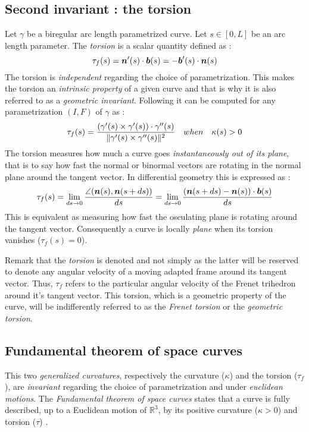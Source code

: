 \subsection{Second invariant : the torsion}\label{sec:torsion}
Let $\gamma$ be a biregular arc length parametrized curve. Let $s \in [0,L]$ be an arc length parameter. The \emph{torsion} is a scalar quantity defined as :
\begin{equation}
	\tau_f(s) = \boldsymbol{n}'(s) \cdot \boldsymbol{b}(s) = - \boldsymbol{b}'(s) \cdot \boldsymbol{n}(s)
\end{equation}
The torsion is \emph{independent} regarding the choice of parametrization. This makes the torsion an \emph{intrinsic property} of a given curve and that is why it is also referred to as a \emph{geometric invariant}. Following \cite[p.204]{Gray2006} it can be computed for any parametrization $(I,F)$ of $\gamma$ as :
\begin{equation}
	\tau_f(s) = \frac{(\gamma'(s) \times \gamma'(s)) \cdot \gamma''(s)}{\lVert\gamma'(s) \times \gamma''(s)\rVert^2}
	\quad when \quad
	\kappa(s) > 0
\end{equation}
The torsion measures how much a curve goes \emph{instantaneously out of its plane}, that is to say how fast the normal or binormal vectors are rotating in the normal plane around the tangent vector. In differential geometry this is expressed as :
\begin{equation}
	\tau_f(s) 
	= \lim_{ds \to 0}\frac{\angle(\boldsymbol{n}(s),\boldsymbol{n}(s+ds))}{ds}
	= \lim_{ds \to 0}\frac{(\boldsymbol{n}(s+ds) - \boldsymbol{n}(s)) \cdot \boldsymbol{b}(s)}{ds}
\end{equation}
This is equivalent as measuring how fast the osculating plane is rotating around the tangent vector. Consequently a curve is locally \emph{plane} when its torsion vanishes ($\tau_f(s) = 0$).

Remark that the \emph{torsion} is denoted  and not simply \textquote{$\tau$} as the latter will be reserved to denote any angular velocity of a moving adapted frame around its tangent vector. Thus, $\tau_f$ refers to the particular angular velocity of the Frenet trihedron around it's tangent vector. This torsion, which is a geometric property of the curve, will be indifferently referred to as the \emph{Frenet torsion} or the \emph{geometric torsion}.

\subsection{Fundamental theorem of space curves}\label{sec:fundamental}
This two \emph{generalized curvatures}, respectively the curvature ($\kappa$) and the torsion ($\tau_f$), are \emph{invariant} regarding the choice of parametrization and under \emph{euclidean motions}. The \emph{Fundamental theorem of space curves} states that a curve is fully described, up to a Euclidean motion of ${\mathbb{R}}^3$, by its positive curvature ($\kappa > 0$) and torsion ($\tau$) \cite[p.229]{Gray2006}.

